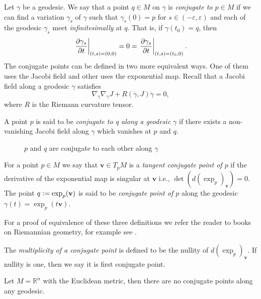 \bigskip
\hf Let $\gamma$ be a geodesic. We say that a point $q\in M$ on $\gamma$ is \textit{conjugate to $p\in M$} if we can find a variation $\gamma_s$ of $\gamma$ such that $\gamma_s(0)=p$ for $s\in (-\varepsilon,\varepsilon)$ and each of the geodesic $\gamma_s$ meet \textit{infinitesimally} at $q$. That is, if $\gamma(t_0)=q$, then
\begin{displaymath}
    \left.\dfrac{\partial\gamma_s}{\partial t}\right|_{(t,s)=(0,0)}=0 = \left.\dfrac{\partial\gamma_s}{\partial t}\right|_{(t,s)=(t_0,0)}.
\end{displaymath}
The conjugate points can be defined in two more equivalent ways. One of them uses the Jacobi field and other uses the exponential map. Recall that a Jacobi field along a geodesic $\gamma$ satisfies 
\begin{displaymath}
    \nabla_{\dot{\gamma}}\nabla_{\dot{\gamma}}J + R \left(\dot{\gamma},J\right)\dot{\gamma}=0,
\end{displaymath}
where $R$ is the Riemann curvature tensor.
\begin{defn} \label{defn:ConjugatePointsInTermsOfJacobiFields}
    A point $p$ is said to be \textit{conjugate to q along a geodesic $\gamma$} if there exists a non-vanishing Jacobi field along $\gamma$ which vanishes at $p$ and $q$.
\end{defn}
\begin{figure}[H]
    \centering
    \caption{$p$ and $q$ are conjugate to each other along $\gamma$\label{fig:sample}}
\end{figure}

\begin{defn} \label{defn:ConjugatePointsInTermsOfExponentialMap}
    For a point $p\in M$ we say that $\mathbf{v}\in T_pM$ is a \textit{tangent conjugate point of $p$} if the derivative of the exponential map is singular at $\mathbf{v}$ i.e., $\det \left(d \left(\exp_p\right)_\mathbf{v}\right)=0$. The point $q\vcentcolon= \exp_p(\mathbf{v})$ is said to be \textit{conjugate point of $p$} along the geodesic $\gamma(t)=\exp_p(t \mathbf{v})$. 
\end{defn}
\vspace{0.3cm}
For a proof of equivalence of these three definitions we refer the reader to books on Riemannian geometry, for example see \cite{Car92}. 

\vspace{0.3cm} 
\hf The \textit{multiplicity of a conjugate point} is defined to be the nullity of $d(\exp_p)_\mathbf{v}$. If nullity is one, then we say it is first conjugate point. 
\vspace{0.3cm}
\begin{eg}
    Let $M=\mathbb{R}^n$ with the Euclidean metric, then there are no conjugate points along any geodesic. 
\end{eg}

